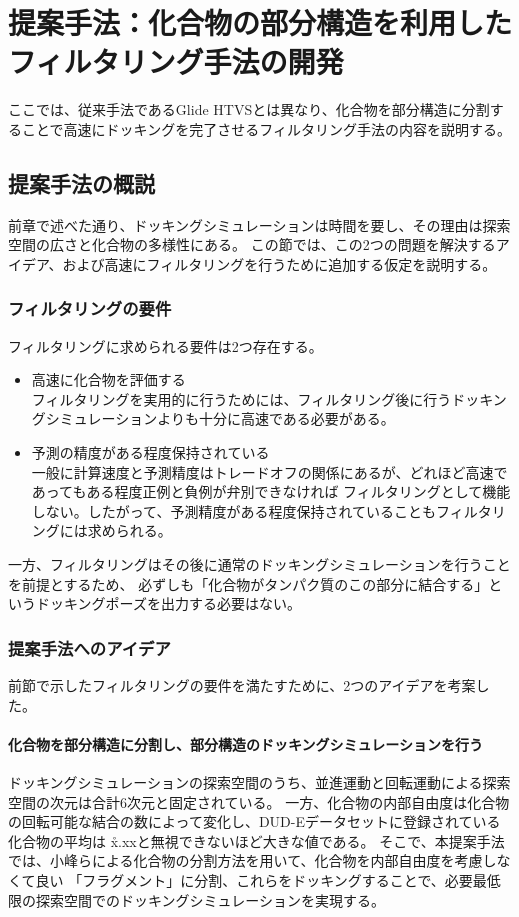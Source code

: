 \chapter{提案手法：化合物の部分構造を利用したフィルタリング手法の開発}
ここでは、従来手法であるGlide HTVSとは異なり、化合物を部分構造に分割することで高速にドッキングを完了させるフィルタリング手法の内容を説明する。

\section{提案手法の概説}
前章で述べた通り、ドッキングシミュレーションは時間を要し、その理由は探索空間の広さと化合物の多様性にある。
この節では、この2つの問題を解決するアイデア、および高速にフィルタリングを行うために追加する仮定を説明する。

\subsection{フィルタリングの要件}\label{subsec}
フィルタリングに求められる要件は2つ存在する。
\begin{itemize}
\item 高速に化合物を評価する\\
	フィルタリングを実用的に行うためには、フィルタリング後に行うドッキングシミュレーションよりも十分に高速である必要がある。
\item 予測の精度がある程度保持されている\\
	一般に計算速度と予測精度はトレードオフの関係にあるが、どれほど高速であってもある程度正例と負例が弁別できなければ
	フィルタリングとして機能しない。したがって、予測精度がある程度保持されていることもフィルタリングには求められる。
\end{itemize}
一方、フィルタリングはその後に通常のドッキングシミュレーションを行うことを前提とするため、
必ずしも「化合物がタンパク質のこの部分に結合する」というドッキングポーズを出力する必要はない。

\subsection{提案手法へのアイデア}\label{subsec:idea}
前節で示したフィルタリングの要件を満たすために、2つのアイデアを考案した。

\subsubsection{化合物を部分構造に分割し、部分構造のドッキングシミュレーションを行う}
ドッキングシミュレーションの探索空間のうち、並進運動と回転運動による探索空間の次元は合計6次元と固定されている。
一方、化合物の内部自由度は化合物の回転可能な結合の数によって変化し、DUD-Eデータセットに登録されている化合物の平均は
\r{x.xx}と無視できないほど大きな値である。
そこで、本提案手法では、小峰ら\citetodo{}による化合物の分割方法を用いて、化合物を内部自由度を考慮しなくて良い
「フラグメント」に分割、これらをドッキングすることで、必要最低限の探索空間でのドッキングシミュレーションを実現する。

